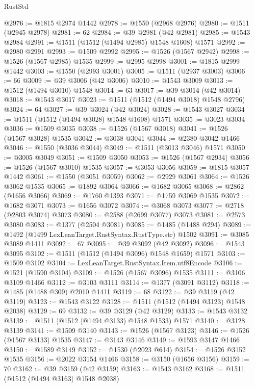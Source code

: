 \begin{lexlean}{RustStd}
\begin{coremodule}
{\begin{coremodule}
{{{{{{{{{{{{{{{{{{{{{{{{{{{{{{{{{{{@2976 := @1815 @2974 @1442
@2978 := @1550 (@2968 @2976)
@2980 := @1511 (@2945 @2978)
@2981 := 62
@2984 := @39 @2981 (@42 @2981)
@2985 := @1543 @2984
@2991 := @1511 (@1512 (@1494 @2985) @1548 @1608) @1571
@2992 := @2980 @2991
@2993 := @1509 @2992
@2995 := @1526 (@1567 @2942)
@2998 := @1526 (@1567 @2985) @1535
@2999 := @2995 @2998
@3001 := @1815 @2999 @1442
@3003 := @1550 (@2993 @3001)
@3005 := @1511 (@2937 @3003)
@3006 := 66
@3009 := @39 @3006 (@42 @3006)
@3010 := @1543 @3009
@3013 := @1512 (@1494 @3010) @1548
@3014 := 63
@3017 := @39 @3014 (@42 @3014)
@3018 := @1543 @3017
@3023 := @1511 (@1512 (@1494 @3018) @1548 @2796)
@3024 := 64
@3027 := @39 @3024 (@42 @3024)
@3028 := @1543 @3027
@3034 := @1511 (@1512 (@1494 @3028) @1548 @1608) @1571
@3035 := @3023 @3034
@3036 := @1509 @3035
@3038 := @1526 (@1567 @3018)
@3041 := @1526 (@1567 @3028) @1535
@3042 := @3038 @3041
@3044 := @2380 @3042 @1466
@3046 := @1550 (@3036 @3044)
@3049 := @1511 (@3013 @3046) @1571
@3050 := @3005 @3049
@3051 := @1509 @3050
@3053 := @1526 (@1567 @2934)
@3056 := @1526 (@1567 @3010) @1535
@3057 := @3053 @3056
@3059 := @1815 @3057 @1442
@3061 := @1550 (@3051 @3059)
@3062 := @2929 @3061
@3064 := @1526 @3062 @1535
@3065 := @1892 @3064
@3066 := @1682 @3065
@3068 := @2862 (@1656 @3066)
@3069 := @1760 @1393
@3071 := @1759 @3069 @1535
@3072 := @1682 @3071
@3073 := @1656 @3072
@3074 := @3068 @3073
@3077 := @2718 (@2803 @3074) @3073
@3080 := @2588 (@2699 @3077) @3073
@3081 := @2573 @3080
@3083 := @1377 (@2504 @3081)
@3085 := @1485 (@1488 @294)
@3089 := @1492 (@1499 LexLeanTarget.RustSyntax.RustType.str) @1502
@3091 := @3085 @3089 @1411
@3092 := 67
@3095 := @39 @3092 (@42 @3092)
@3096 := @1543 @3095
@3102 := @1511 (@1512 (@1494 @3096) @1548 @1659) @1571
@3103 := @1509 @3102
@3104 := LexLeanTarget.RustSyntax.Item.utf8Encode
@3106 := @1521 (@1590 @3104)
@3109 := @1526 (@1567 @3096) @1535
@3111 := @3106 @3109 @1466
@3112 := @3103 @3111
@3114 := @1377 (@3091 @3112)
@3118 := @1485 (@1488 @309) @2010 @1411
@3119 := 68
@3122 := @39 @3119 (@42 @3119)
@3123 := @1543 @3122
@3128 := @1511 (@1512 (@1494 @3123) @1548 @2038)
@3129 := 69
@3132 := @39 @3129 (@42 @3129)
@3133 := @1543 @3132
@3139 := @1511 (@1512 (@1494 @3133) @1548 @1533) @1571
@3140 := @3128 @3139
@3141 := @1509 @3140
@3143 := @1526 (@1567 @3123)
@3146 := @1526 (@1567 @3133) @1535
@3147 := @3143 @3146
@3149 := @1593 @3147 @1466
@3150 := @1589 @3149
@3152 := @1530 (@2023 @614)
@3154 := @1526 @3152 @1535
@3156 := @2022 @3154 @1466
@3158 := @3150 (@1656 @3156)
@3159 := 70
@3162 := @39 @3159 (@42 @3159)
@3163 := @1543 @3162
@3168 := @1511 (@1512 (@1494 @3163) @1548 @2038)
}}}}}}}}}}}}}}}}}}}}}}}}}}}}}}}}}}}
\end{coremodule}}
\end{coremodule}
\end{lexlean}
